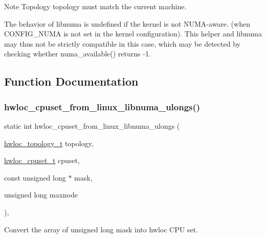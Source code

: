 \begin{DoxyNote}{Note}
Topology {\ttfamily topology} must match the current machine.

The behavior of libnuma is undefined if the kernel is not N\+U\+M\+A-\/aware. (when C\+O\+N\+F\+I\+G\+\_\+\+N\+U\+MA is not set in the kernel configuration). This helper and libnuma may thus not be strictly compatible in this case, which may be detected by checking whether numa\+\_\+available() returns -\/1. 
\end{DoxyNote}


\subsection{Function Documentation}
\mbox{\label{a00215_ga0e9d051e068940f722f6fdc61814149d}} 
\subsubsection{\texorpdfstring{hwloc\+\_\+cpuset\+\_\+from\+\_\+linux\+\_\+libnuma\+\_\+ulongs()}{hwloc\_cpuset\_from\_linux\_libnuma\_ulongs()}}
{\footnotesize\ttfamily static int hwloc\+\_\+cpuset\+\_\+from\+\_\+linux\+\_\+libnuma\+\_\+ulongs (\begin{DoxyParamCaption}\item[{\hyperlink{a00186_ga9d1e76ee15a7dee158b786c30b6a6e38}{hwloc\+\_\+topology\+\_\+t}}]{topology,  }\item[{\hyperlink{a00183_ga4bbf39b68b6f568fb92739e7c0ea7801}{hwloc\+\_\+cpuset\+\_\+t}}]{cpuset,  }\item[{const unsigned long $\ast$}]{mask,  }\item[{unsigned long}]{maxnode }\end{DoxyParamCaption})\hspace{0.3cm}{\ttfamily [inline]}, {\ttfamily [static]}}



Convert the array of unsigned long {\ttfamily mask} into hwloc C\+PU set. 

